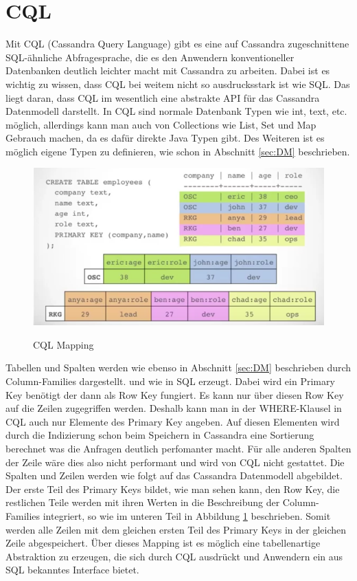 \section{CQL}
Mit CQL (Cassandra Query Language) gibt es eine auf Cassandra zugeschnittene SQL-ähnliche Abfragesprache, die es den Anwendern konventioneller Datenbanken deutlich leichter macht mit Cassandra zu arbeiten. Dabei ist es wichtig zu wissen, dass CQL bei weitem nicht so ausdrucksstark ist wie SQL. Das liegt daran, dass CQL im wesentlich eine abstrakte API für das Cassandra Datenmodell darstellt. In CQL sind normale Datenbank Typen wie int, text, etc. möglich, allerdings kann man auch von Collections wie List, Set und Map Gebrauch machen, da es dafür direkte Java Typen gibt. Des Weiteren ist es möglich eigene Typen zu definieren, wie schon in Abschnitt \ref{sec:DM} beschrieben.\\
\begin{figure}[htbp!]
	\centering
	\includegraphics[scale=0.7]{pics/cql_mapping.png}\\
	\caption{CQL Mapping}
	\label{fig:mapping}
\end{figure}
Tabellen und Spalten werden wie ebenso in Abschnitt \ref{sec:DM} beschrieben durch Column-Families dargestellt. und wie in SQL erzeugt. Dabei wird ein Primary Key benötigt der dann als Row Key fungiert. Es kann nur über diesen Row Key auf die Zeilen zugegriffen werden. Deshalb kann man in der WHERE-Klausel in CQL auch nur Elemente des Primary Key angeben. Auf diesen Elementen wird durch die Indizierung schon beim Speichern in Cassandra eine Sortierung berechnet was die Anfragen deutlich perfomanter macht. Für alle anderen Spalten der Zeile wäre dies also nicht performant und wird von CQL nicht gestattet. Die Spalten und Zeilen werden wie folgt auf das Cassandra Datenmodell abgebildet.\\
Der erste Teil des Primary Keys bildet, wie man sehen kann, den Row Key, die restlichen Teile werden mit ihren Werten in die Beschreibung der Column-Families integriert, so wie im unteren Teil in Abbildung \ref{fig:mapping} beschrieben. Somit werden alle Zeilen mit dem gleichen ersten Teil des Primary Keys in der gleichen Zeile abgespeichert. Über dieses Mapping ist es möglich eine tabellenartige Abstraktion zu erzeugen, die sich durch CQL ausdrückt und Anwendern ein aus SQL bekanntes Interface bietet.
